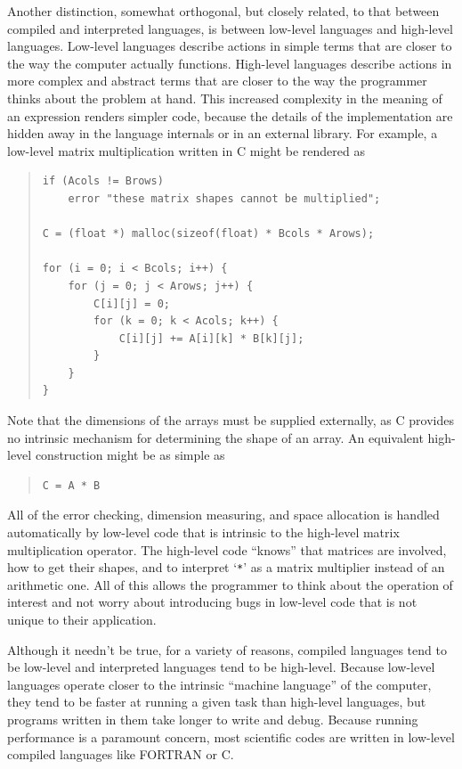 Another distinction, somewhat orthogonal, but closely related, to that
between compiled and interpreted languages, is between low-level
languages and high-level languages.  Low-level languages describe
actions in simple terms that are closer to the way the computer actually
functions.  High-level languages describe actions in more complex and
abstract terms that are closer to the way the programmer thinks about
the problem at hand.  This increased complexity in the meaning of an
expression renders simpler code, because the details of the
implementation are hidden away in the language internals or in an
external library.  For example, a low-level matrix multiplication
written in C might be rendered as
\begin{quote}
\begin{verbatim}
if (Acols != Brows) 
    error "these matrix shapes cannot be multiplied";

C = (float *) malloc(sizeof(float) * Bcols * Arows);

for (i = 0; i < Bcols; i++) {
    for (j = 0; j < Arows; j++) {
        C[i][j] = 0;
        for (k = 0; k < Acols; k++) {
            C[i][j] += A[i][k] * B[k][j];
        }
    }
}
\end{verbatim}
\end{quote}
Note that the dimensions of the arrays must be supplied externally, as
C provides no intrinsic mechanism for determining the shape of an
array.  An equivalent high-level construction might be as simple as
\begin{quote}
\begin{verbatim}
C = A * B
\end{verbatim}
\end{quote}
All of the error checking, dimension measuring, and space allocation
is handled automatically by low-level code that is intrinsic to the
high-level matrix multiplication operator.  The high-level code
``knows'' that matrices are involved, how to get their shapes, and to
interpret `\verb|*|' as a matrix multiplier instead of an arithmetic
one.  All of this allows the programmer to think about the operation
of interest and not worry about introducing bugs in low-level code
that is not unique to their application.

Although it needn't be true, for a variety of reasons, compiled
languages tend to be low-level and interpreted languages tend to be
high-level.  Because low-level languages operate closer to the
intrinsic ``machine language'' of the computer, they tend to be faster
at running a given task than high-level languages, but programs
written in them take longer to write and debug.  Because running
performance is a paramount concern, most scientific codes are written
in low-level compiled languages like FORTRAN or C.

